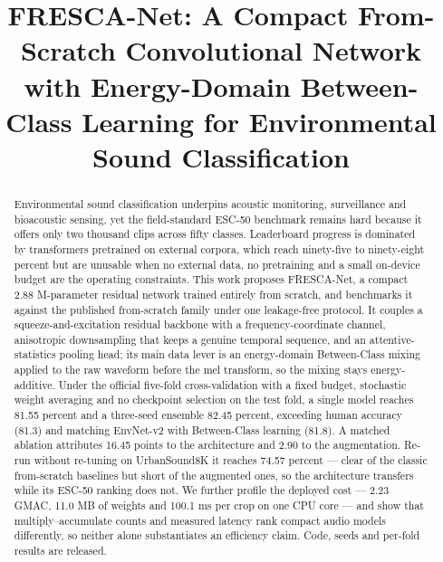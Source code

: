 \documentclass[conference]{IEEEtran}
\begin{document}
\title{FRESCA-Net: A Compact From-Scratch Convolutional Network with Energy-Domain Between-Class Learning for Environmental Sound Classification}

\author{
\and
{}
}

\maketitle

\begin{abstract}
Environmental sound classification underpins acoustic monitoring, surveillance and bioacoustic sensing, yet the field-standard ESC-50 benchmark remains hard because it offers only two thousand clips across fifty classes. Leaderboard progress is dominated by transformers pretrained on external corpora, which reach ninety-five to ninety-eight percent but are unusable when no external data, no pretraining and a small on-device budget are the operating constraints. This work proposes FRESCA-Net, a compact 2.88 M-parameter residual network trained entirely from scratch, and benchmarks it against the published from-scratch family under one leakage-free protocol. It couples a squeeze-and-excitation residual backbone with a frequency-coordinate channel, anisotropic downsampling that keeps a genuine temporal sequence, and an attentive-statistics pooling head; its main data lever is an energy-domain Between-Class mixing applied to the raw waveform before the mel transform, so the mixing stays energy-additive. Under the official five-fold cross-validation with a fixed budget, stochastic weight averaging and no checkpoint selection on the test fold, a single model reaches 81.55 percent and a three-seed ensemble 82.45 percent, exceeding human accuracy (81.3) and matching EnvNet-v2 with Between-Class learning (81.8). A matched ablation attributes 16.45 points to the architecture and 2.90 to the augmentation. Re-run without re-tuning on UrbanSound8K it reaches 74.57 percent --- clear of the classic from-scratch baselines but short of the augmented ones, so the architecture transfers while its ESC-50 ranking does not. We further profile the deployed cost --- 2.23 GMAC, 11.0 MB of weights and 100.1 ms per crop on one CPU core --- and show that multiply--accumulate counts and measured latency rank compact audio models differently, so neither alone substantiates an efficiency claim. Code, seeds and per-fold results are released.
\end{abstract}
\end{document}
